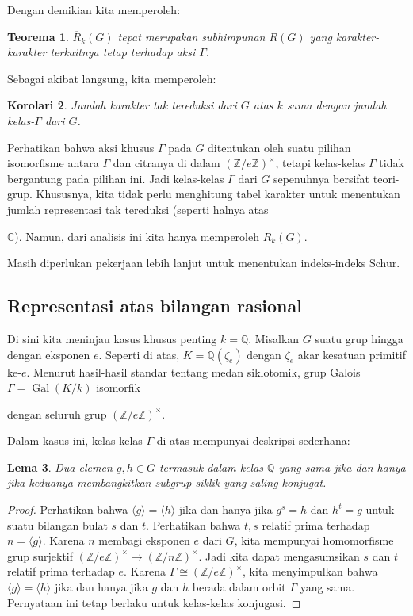 \documentclass[12pt]{article}
\theoremstyle{plain}
\newtheorem{theorem}{Teorema}[section]
\newtheorem{lemma}[theorem]{Lema}
\newtheorem{corollary}[theorem]{Korolari}
\theoremstyle{definition}
\theoremstyle{remark}
\numberwithin{equation}{section}
\begin{document}
Dengan demikian kita memperoleh:
\begin{theorem}
$\overline{R}_k(G)$ tepat merupakan subhimpunan $R(G)$ yang karakter-karakter
terkaitnya tetap terhadap aksi $\Gamma$.

\end{theorem}

Sebagai akibat langsung, kita memperoleh:
\begin{corollary}
Jumlah karakter tak tereduksi dari $G$ atas $k$
sama dengan jumlah kelas-$\Gamma$ dari $G$.

\end{corollary}
Perhatikan bahwa aksi khusus $\Gamma$ pada $G$ ditentukan oleh suatu
pilihan isomorfisme antara $\Gamma$ dan citranya di dalam
$(\mathbb{Z}/e\mathbb{Z})^\times$, tetapi kelas-kelas $\Gamma$ tidak
bergantung pada pilihan ini.
Jadi kelas-kelas $\Gamma$ dari $G$ sepenuhnya bersifat teori-grup.
Khususnya, kita tidak perlu menghitung tabel karakter
untuk menentukan jumlah representasi tak tereduksi (seperti halnya atas

$\mathbb{C}$).
Namun, dari analisis ini kita hanya memperoleh $\overline{R}_k(G)$.

Masih diperlukan pekerjaan lebih lanjut untuk menentukan indeks-indeks Schur.

\subsection{Representasi atas bilangan rasional}
Di sini kita meninjau kasus khusus penting $k=\mathbb{Q}$.
Misalkan $G$ suatu grup hingga dengan eksponen $e$.
Seperti di atas, $K=\mathbb{Q}(\zeta_e)$ dengan $\zeta_e$ akar kesatuan primitif
ke-$e$.
Menurut hasil-hasil standar tentang medan siklotomik, grup Galois
$\Gamma = \operatorname{Gal}(K/k)$ isomorfik

dengan seluruh grup $(\mathbb{Z}/e\mathbb{Z})^\times$.

Dalam kasus ini, kelas-kelas $\Gamma$ di atas mempunyai deskripsi sederhana:
\begin{lemma}
Dua elemen $g,h \in G$ termasuk dalam kelas-$\mathbb{Q}$ yang sama jika dan
hanya jika keduanya membangkitkan subgrup siklik yang saling konjugat.

\end{lemma}
\begin{proof}
Perhatikan bahwa $\langle g \rangle = \langle h \rangle$ jika dan hanya jika
$g^s = h$ dan $h^t= g$ untuk suatu bilangan bulat $s$ dan $t$.
Perhatikan bahwa $t,s$ relatif prima terhadap $n=\langle g \rangle$.
Karena $n$ membagi eksponen $e$ dari $G$, kita mempunyai homomorfisme grup
surjektif $(\mathbb{Z}/e\mathbb{Z})^\times \to (\mathbb{Z}/n\mathbb{Z})^\times$.
Jadi kita dapat mengasumsikan $s$ dan $t$ relatif prima terhadap $e$.
Karena $\Gamma \cong (\mathbb{Z}/e\mathbb{Z})^\times$,
kita menyimpulkan bahwa $\langle g \rangle = \langle h \rangle$ jika dan hanya jika
$g$ dan $h$ berada dalam orbit $\Gamma$ yang sama.
Pernyataan ini tetap berlaku untuk kelas-kelas konjugasi. 
\end{proof}
\end{document}
